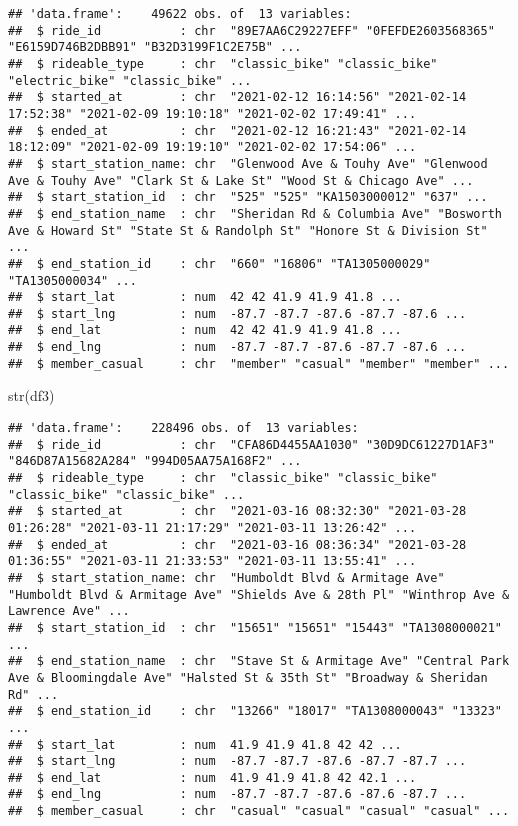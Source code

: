 \documentclass[
]{article}
\newenvironment{Shaded}{\begin{snugshade}}{\end{snugshade}}
\newcommand{\FunctionTok}[1]{\textcolor[rgb]{0.00,0.00,0.00}{#1}}
\newcommand{\NormalTok}[1]{#1}
\begin{document}
\begin{verbatim}
## 'data.frame':    49622 obs. of  13 variables:
##  $ ride_id           : chr  "89E7AA6C29227EFF" "0FEFDE2603568365" "E6159D746B2DBB91" "B32D3199F1C2E75B" ...
##  $ rideable_type     : chr  "classic_bike" "classic_bike" "electric_bike" "classic_bike" ...
##  $ started_at        : chr  "2021-02-12 16:14:56" "2021-02-14 17:52:38" "2021-02-09 19:10:18" "2021-02-02 17:49:41" ...
##  $ ended_at          : chr  "2021-02-12 16:21:43" "2021-02-14 18:12:09" "2021-02-09 19:19:10" "2021-02-02 17:54:06" ...
##  $ start_station_name: chr  "Glenwood Ave & Touhy Ave" "Glenwood Ave & Touhy Ave" "Clark St & Lake St" "Wood St & Chicago Ave" ...
##  $ start_station_id  : chr  "525" "525" "KA1503000012" "637" ...
##  $ end_station_name  : chr  "Sheridan Rd & Columbia Ave" "Bosworth Ave & Howard St" "State St & Randolph St" "Honore St & Division St" ...
##  $ end_station_id    : chr  "660" "16806" "TA1305000029" "TA1305000034" ...
##  $ start_lat         : num  42 42 41.9 41.9 41.8 ...
##  $ start_lng         : num  -87.7 -87.7 -87.6 -87.7 -87.6 ...
##  $ end_lat           : num  42 42 41.9 41.9 41.8 ...
##  $ end_lng           : num  -87.7 -87.7 -87.6 -87.7 -87.6 ...
##  $ member_casual     : chr  "member" "casual" "member" "member" ...
\end{verbatim}

\begin{Shaded}
\begin{Highlighting}[]
\FunctionTok{str}\NormalTok{(df3)}
\end{Highlighting}
\end{Shaded}

\begin{verbatim}
## 'data.frame':    228496 obs. of  13 variables:
##  $ ride_id           : chr  "CFA86D4455AA1030" "30D9DC61227D1AF3" "846D87A15682A284" "994D05AA75A168F2" ...
##  $ rideable_type     : chr  "classic_bike" "classic_bike" "classic_bike" "classic_bike" ...
##  $ started_at        : chr  "2021-03-16 08:32:30" "2021-03-28 01:26:28" "2021-03-11 21:17:29" "2021-03-11 13:26:42" ...
##  $ ended_at          : chr  "2021-03-16 08:36:34" "2021-03-28 01:36:55" "2021-03-11 21:33:53" "2021-03-11 13:55:41" ...
##  $ start_station_name: chr  "Humboldt Blvd & Armitage Ave" "Humboldt Blvd & Armitage Ave" "Shields Ave & 28th Pl" "Winthrop Ave & Lawrence Ave" ...
##  $ start_station_id  : chr  "15651" "15651" "15443" "TA1308000021" ...
##  $ end_station_name  : chr  "Stave St & Armitage Ave" "Central Park Ave & Bloomingdale Ave" "Halsted St & 35th St" "Broadway & Sheridan Rd" ...
##  $ end_station_id    : chr  "13266" "18017" "TA1308000043" "13323" ...
##  $ start_lat         : num  41.9 41.9 41.8 42 42 ...
##  $ start_lng         : num  -87.7 -87.7 -87.6 -87.7 -87.7 ...
##  $ end_lat           : num  41.9 41.9 41.8 42 42.1 ...
##  $ end_lng           : num  -87.7 -87.7 -87.6 -87.6 -87.7 ...
##  $ member_casual     : chr  "casual" "casual" "casual" "casual" ...
\end{verbatim}
\end{document}
